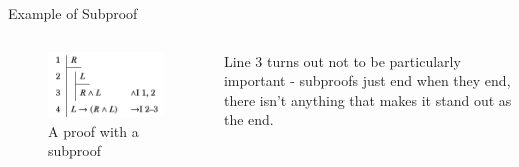 \documentclass[
  ignorenonframetext,
]{beamer}
\renewcommand{\,}{\text{, }}
\begin{document}
\begin{frame}{Example of Subproof}
\protect\hypertarget{example-of-subproof-1}{}
\begin{columns}[c]
\begin{column}{0.48\textwidth}
\begin{figure}
\centering
\includegraphics{4_7c.png}
\caption{A proof with a subproof}
\end{figure}
\end{column}

\begin{column}{0.48\textwidth}
Line 3 turns out not to be particularly important - subproofs just end
when they end, there isn't anything that makes it stand out as the end.
\end{column}
\end{columns}
\end{frame}
\end{document}
